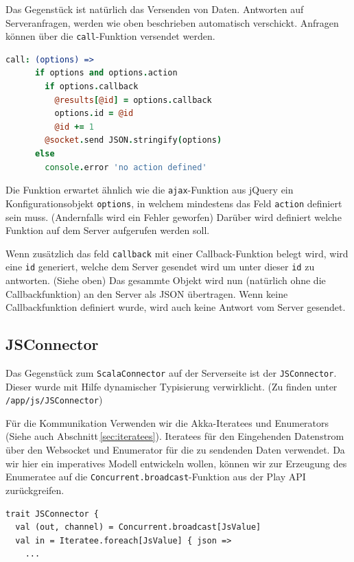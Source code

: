 Das Gegenstück ist natürlich das Versenden von Daten. Antworten auf Serveranfragen, werden wie oben
beschrieben automatisch verschickt. Anfragen können über die \texttt{call}-Funktion versendet
werden.

\begin{lstlisting}[language=coffee] 
    call: (options) =>      
      if options and options.action        
        if options.callback
          @results[@id] = options.callback
          options.id = @id
          @id += 1
        @socket.send JSON.stringify(options)
      else
        console.error 'no action defined'
\end{lstlisting}

Die Funktion erwartet ähnlich wie die \texttt{ajax}-Funktion aus jQuery ein Konfigurationsobjekt
\texttt{options}, in welchem mindestens das Feld \texttt{action} definiert sein muss. (Andernfalls
wird ein Fehler geworfen) Darüber wird definiert welche Funktion auf dem Server aufgerufen werden
soll.

Wenn zusätzlich das feld \texttt{callback} mit einer Callback-Funktion belegt wird, wird eine
\texttt{id} generiert, welche dem Server gesendet wird um unter dieser \texttt{id} zu antworten.
(Siehe oben) Das gesammte Objekt wird nun (natürlich ohne die Callbackfunktion) an den Server als
JSON übertragen. Wenn keine Callbackfunktion definiert wurde, wird auch keine Antwort vom Server
gesendet.

\subsection{JSConnector}

Das Gegenstück zum \texttt{ScalaConnector} auf der Serverseite ist der \texttt{JSConnector}. Dieser
wurde mit Hilfe dynamischer Typisierung verwirklicht. (Zu finden unter \texttt{/app/js/JSConnector})

Für die Kommunikation Verwenden wir die Akka-Iteratees und Enumerators (Siehe auch
Abschnitt\,\ref{sec:iteratees}). Iteratees für den Eingehenden Datenstrom über den Websocket und
Enumerator für die zu sendenden Daten verwendet. Da wir hier ein imperatives Modell entwickeln
wollen, können wir zur Erzeugung des Enumeratee auf die \texttt{Concurrent.broadcast}-Funktion aus
der Play API zurückgreifen.

\begin{lstlisting}
trait JSConnector {
  val (out, channel) = Concurrent.broadcast[JsValue]
  val in = Iteratee.foreach[JsValue] { json =>
    ...
\end{lstlisting}

